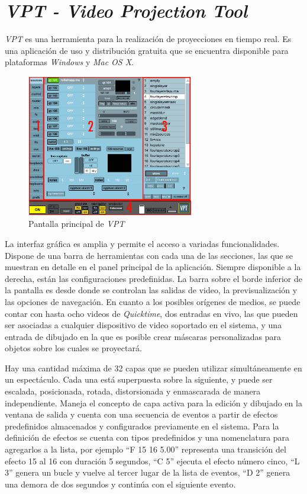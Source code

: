 \section{\emph{VPT - Video Projection Tool}}
\emph{VPT}\cite{VPT} es una herramienta para la realización de proyecciones en tiempo real. Es una aplicación de uso y distribución gratuita que se encuentra disponible para plataformas \emph{Windows} y \emph{Mac OS X}.

\begin{figure}[H]
  \centering
    \includegraphics[width=0.65\textwidth]{./Apendices/Cap3_aplicaciones/apps-vpt.png}
  \caption[http://hcgilje.wordpress.com/VPT]{Pantalla principal de \emph{VPT}}
  \label{fig:Apps-VPT}
\end{figure}

La interfaz gráfica es amplia y permite el acceso a variadas funcionalidades. Dispone de una barra de herramientas con cada una de las secciones, las que se muestran en detalle en el panel principal de la aplicación. Siempre disponible a la derecha, están las configuraciones predefinidas. La barra sobre el borde inferior de la pantalla es desde donde se controlan las salidas de video, la previsualización y las opciones de navegación.
En cuanto a los posibles orígenes de medios, se puede contar con hasta ocho videos de \emph{Quicktime}, dos entradas en vivo, las que pueden ser asociadas a cualquier dispositivo de video soportado en el sistema, y una entrada de dibujado en la que es posible crear máscaras personalizadas para objetos sobre los cuales se proyectará.

Hay una cantidad máxima de 32 capas que se pueden utilizar simultáneamente en un espectáculo. Cada una está superpuesta sobre la siguiente, y puede ser escalada, posicionada, rotada, distorsionada y enmascarada de manera independiente. Maneja el concepto de capa activa para la edición y dibujado en la ventana de salida y cuenta con una secuencia de eventos a partir de efectos predefinidos almacenados y configurados previamente en el sistema. Para la definición de efectos se cuenta con tipos predefinidos y una nomenclatura para agregarlos a la lista, por ejemplo ``F 15 16 5.00'' representa una transición del efecto 15 al 16 con duración 5 segundos, ``C 5'' ejecuta el efecto número cinco, ``L 3'' genera un bucle y vuelve al tercer lugar de la lista de eventos, ``D 2'' genera una demora de dos segundos y continúa con el siguiente evento.

